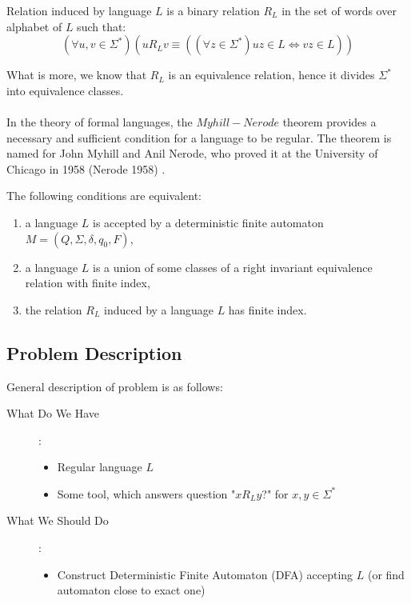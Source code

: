 \documentclass[runningheads, a4paper]{llncs}
\begin{document}
\begin{definition}
Relation induced by language $L$ is a binary relation $R_{L}$ in the set of words over alphabet of $L$ such that:
\[
(\forall{u,v \in \Sigma^{*}})(u R_{L} v \equiv ((\forall z \in \Sigma^{*}) uz \in L \Leftrightarrow vz \in L))
\]
\end{definition}
What is more, we know that $R_{L}$ is an equivalence relation, hence it divides $\Sigma^{*}$ into equivalence classes.

\paragraph{}
In the theory of formal languages, the $Myhill-Nerode$ theorem provides a necessary and sufficient condition for a language to be regular. The theorem is named for John Myhill and Anil Nerode, who proved it at the University of Chicago in 1958 (Nerode 1958) \cite{Myhill_Nerode}.

\begin{theorem}\label{Theorem:Myhill_Nerode}
The following conditions are equivalent:
\begin{enumerate}
\item a language $L$ is accepted by a deterministic finite automaton $M = (Q,\Sigma,\delta,q_0,F)$,
\item a language $L$ is a union of some classes of a right invariant equivalence relation with finite index,
\item the relation $R_{L}$ induced by a language $L$ has finite index.
\end{enumerate}
\end{theorem}

\subsection{Problem Description} \label{sub:definition}
General description of problem is as follows:

\begin{description}
  \item[What Do We Have]: 
   	\begin{itemize}
		\item Regular language $L$
		\item Some tool, which answers question "$x R_{L} y$?" for $x,y \in \Sigma^{*}$
	\end{itemize}
  \item[What We Should Do]:
    \begin{itemize}
		\item Construct Deterministic Finite Automaton (DFA) accepting $L$ (or find automaton close to exact one)
	\end{itemize}
 \end{description}
\end{document}
